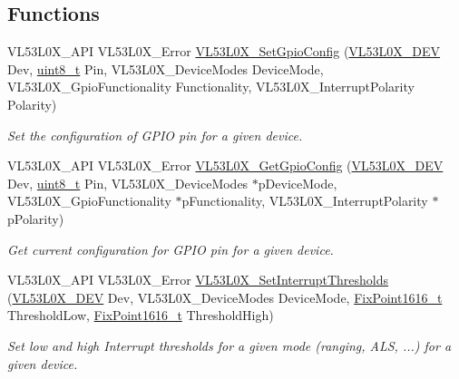 \subsection*{Functions}
\begin{DoxyCompactItemize}
\item 
V\+L53\+L0\+X\+\_\+\+A\+PI V\+L53\+L0\+X\+\_\+\+Error \hyperlink{group__VL53L0X__interrupt__group_ga8793fb3c70a2c297247a103e1b446f49}{V\+L53\+L0\+X\+\_\+\+Set\+Gpio\+Config} (\hyperlink{group__VL53L0X__platform__group_ga2d6405308b1dd524b462f1b8fb97d167}{V\+L53\+L0\+X\+\_\+\+D\+EV} Dev, \hyperlink{vl53l0x__types_8h_aba7bc1797add20fe3efdf37ced1182c5}{uint8\+\_\+t} Pin, V\+L53\+L0\+X\+\_\+\+Device\+Modes Device\+Mode, V\+L53\+L0\+X\+\_\+\+Gpio\+Functionality Functionality, V\+L53\+L0\+X\+\_\+\+Interrupt\+Polarity Polarity)
\begin{DoxyCompactList}\small\item\em Set the configuration of G\+P\+IO pin for a given device. \end{DoxyCompactList}\item 
V\+L53\+L0\+X\+\_\+\+A\+PI V\+L53\+L0\+X\+\_\+\+Error \hyperlink{group__VL53L0X__interrupt__group_gadb505a2440a9e00170bca1da6ca6a50f}{V\+L53\+L0\+X\+\_\+\+Get\+Gpio\+Config} (\hyperlink{group__VL53L0X__platform__group_ga2d6405308b1dd524b462f1b8fb97d167}{V\+L53\+L0\+X\+\_\+\+D\+EV} Dev, \hyperlink{vl53l0x__types_8h_aba7bc1797add20fe3efdf37ced1182c5}{uint8\+\_\+t} Pin, V\+L53\+L0\+X\+\_\+\+Device\+Modes $\ast$p\+Device\+Mode, V\+L53\+L0\+X\+\_\+\+Gpio\+Functionality $\ast$p\+Functionality, V\+L53\+L0\+X\+\_\+\+Interrupt\+Polarity $\ast$p\+Polarity)
\begin{DoxyCompactList}\small\item\em Get current configuration for G\+P\+IO pin for a given device. \end{DoxyCompactList}\item 
V\+L53\+L0\+X\+\_\+\+A\+PI V\+L53\+L0\+X\+\_\+\+Error \hyperlink{group__VL53L0X__interrupt__group_ga3c49d83194d278e3a2706ee1732e28de}{V\+L53\+L0\+X\+\_\+\+Set\+Interrupt\+Thresholds} (\hyperlink{group__VL53L0X__platform__group_ga2d6405308b1dd524b462f1b8fb97d167}{V\+L53\+L0\+X\+\_\+\+D\+EV} Dev, V\+L53\+L0\+X\+\_\+\+Device\+Modes Device\+Mode, \hyperlink{vl53l0x__types_8h_afb910790161809fc76e1a274a6349384}{Fix\+Point1616\+\_\+t} Threshold\+Low, \hyperlink{vl53l0x__types_8h_afb910790161809fc76e1a274a6349384}{Fix\+Point1616\+\_\+t} Threshold\+High)
\begin{DoxyCompactList}\small\item\em Set low and high Interrupt thresholds for a given mode (ranging, A\+LS, ...) for a given device. \end{DoxyCompactList}\item 

\end{DoxyCompactItemize}
